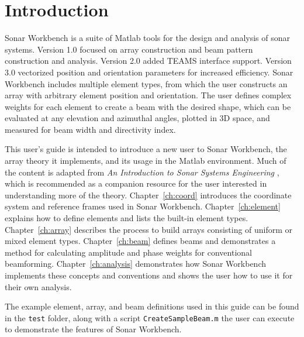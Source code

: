 \chapter{Introduction}\label{ch:intro}

Sonar Workbench is a suite of Matlab tools for the design and analysis of sonar systems. Version 1.0 focused on array construction and beam pattern construction and analysis. Version 2.0 added TEAMS interface support. Version 3.0 vectorized position and orientation parameters for increased efficiency. Sonar Workbench includes multiple element types, from which the user constructs an array with arbitrary element position and orientation. The user defines complex weights for each element to create a beam with the desired shape, which can be evaluated at any elevation and azimuthal angles, plotted in 3D space, and measured for beam width and directivity index.

This user's guide is intended to introduce a new user to Sonar Workbench, the array theory it implements, and its usage in the Matlab environment. Much of the content is adapted from \emph{An Introduction to Sonar Systems Engineering} \cite{Ziomek}, which is recommended as a companion resource for the user interested in understanding more of the theory. Chapter~\ref{ch:coord} introduces the coordinate system and reference frames used in Sonar Workbench. Chapter~\ref{ch:element} explains how to define elements and lists the built-in element types. Chapter~\ref{ch:array} describes the process to build arrays consisting of uniform or mixed element types. Chapter~\ref{ch:beam} defines beams and demonstrates a method for calculating amplitude and phase weights for conventional beamforming. Chapter~\ref{ch:analysis} demonstrates how Sonar Workbench implements these concepts and conventions and shows the user how to use it for their own analysis.

The example element, array, and beam definitions used in this guide can be found in the \texttt{test} folder, along with a script \texttt{CreateSampleBeam.m} the user can execute to demonstrate the features of Sonar Workbench. 